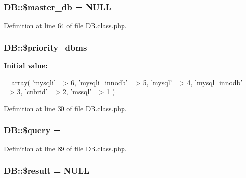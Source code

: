 \subsubsection[{\$master\+\_\+db}]{\setlength{\rightskip}{0pt plus 5cm}D\+B\+::\$master\+\_\+db = N\+U\+L\+L}\label{classDB_ad0a3ae175a659516131cfc6cd615d15c}


Definition at line 64 of file D\+B.\+class.\+php.

\hypertarget{classDB_a082292b9ca3855cbddd3a74e9490ca82}{}
\subsubsection[{\$priority\+\_\+dbms}]{\setlength{\rightskip}{0pt plus 5cm}D\+B\+::\$priority\+\_\+dbms}\label{classDB_a082292b9ca3855cbddd3a74e9490ca82}
{\bfseries Initial value\+:}
\begin{DoxyCode}
= array(
        \textcolor{stringliteral}{'mysqli'} => 6,
        \textcolor{stringliteral}{'mysqli\_innodb'} => 5,
        \textcolor{stringliteral}{'mysql'} => 4,
        \textcolor{stringliteral}{'mysql\_innodb'} => 3,
        \textcolor{stringliteral}{'cubrid'} => 2,
        \textcolor{stringliteral}{'mssql'} => 1
    )
\end{DoxyCode}


Definition at line 30 of file D\+B.\+class.\+php.

\hypertarget{classDB_a32ebabea908efd805a83db48fec3ab52}{}
\subsubsection[{\$query}]{\setlength{\rightskip}{0pt plus 5cm}D\+B\+::\$query = \textquotesingle{}\textquotesingle{}}\label{classDB_a32ebabea908efd805a83db48fec3ab52}


Definition at line 89 of file D\+B.\+class.\+php.

\hypertarget{classDB_a74e74ee9d3311aa1e8107b8accd05e29}{}
\subsubsection[{\$result}]{\setlength{\rightskip}{0pt plus 5cm}D\+B\+::\$result = N\+U\+L\+L}\label{classDB_a74e74ee9d3311aa1e8107b8accd05e29}


